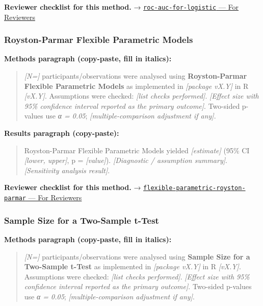 \documentclass[
]{article}
\begin{document}
\textbf{Reviewer checklist for this method.} →
\href{../chapters/07-regression/roc-auc-for-logistic.Rmd\#for-reviewers}{\texttt{roc-auc-for-logistic}
--- For Reviewers}

\subsubsection{Royston-Parmar Flexible Parametric
Models}\label{royston-parmar-flexible-parametric-models}

\textbf{Methods paragraph (copy-paste, fill in italics):}

\begin{quote}
\emph{{[}N={]}} participants/observations were analysed using
\textbf{Royston-Parmar Flexible Parametric Models} as implemented in
\emph{{[}package vX.Y{]}} in R \emph{{[}vX.Y{]}}. Assumptions were
checked: \emph{{[}list checks performed{]}}. \emph{{[}Effect size with
95\% confidence interval reported as the primary outcome{]}}. Two-sided
p-values use \emph{α = 0.05}; \emph{{[}multiple-comparison adjustment if
any{]}}.
\end{quote}

\textbf{Results paragraph (copy-paste):}

\begin{quote}
Royston-Parmar Flexible Parametric Models yielded \emph{{[}estimate{]}}
(95\% CI \emph{{[}lower, upper{]}}, p = \emph{{[}value{]}}).
\emph{{[}Diagnostic / assumption summary{]}}. \emph{{[}Sensitivity
analysis result{]}}.
\end{quote}

\textbf{Reviewer checklist for this method.} →
\href{../chapters/11-survival/flexible-parametric-royston-parmar.Rmd\#for-reviewers}{\texttt{flexible-parametric-royston-parmar}
--- For Reviewers}

\subsubsection{Sample Size for a Two-Sample
t-Test}\label{sample-size-for-a-two-sample-t-test}

\textbf{Methods paragraph (copy-paste, fill in italics):}

\begin{quote}
\emph{{[}N={]}} participants/observations were analysed using
\textbf{Sample Size for a Two-Sample t-Test} as implemented in
\emph{{[}package vX.Y{]}} in R \emph{{[}vX.Y{]}}. Assumptions were
checked: \emph{{[}list checks performed{]}}. \emph{{[}Effect size with
95\% confidence interval reported as the primary outcome{]}}. Two-sided
p-values use \emph{α = 0.05}; \emph{{[}multiple-comparison adjustment if
any{]}}.
\end{quote}
\end{document}
